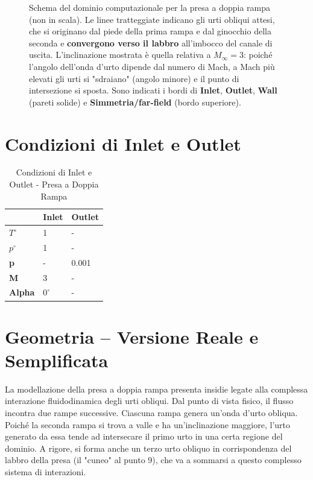 \begin{figure}[H]
  \caption{Schema del dominio computazionale per la presa a doppia rampa (non in scala).
           Le linee tratteggiate indicano gli urti obliqui attesi, che si originano dal piede
           della prima rampa e dal ginocchio della seconda e \textbf{convergono verso il labbro}
           all'imbocco del canale di uscita. L'inclinazione mostrata è quella relativa a
           $M_\infty = 3$: poiché l'angolo dell'onda d'urto dipende dal numero di Mach, a Mach
           più elevati gli urti si "sdraiano" (angolo minore) e il punto di intersezione si
           sposta. Sono indicati i bordi di \textbf{Inlet}, \textbf{Outlet}, \textbf{Wall}
           (pareti solide) e \textbf{Simmetria/far-field} (bordo superiore).}
  \label{fig:dominio_presa}
\end{figure}

\section{Condizioni di Inlet e Outlet}

\begin{table}[h!]
\centering
\begin{tabular}{|l|l|l|}
\hline
 & \textbf{Inlet} & \textbf{Outlet} \\ \hline
\textbf{$T^\circ$} & 1 & - \\ \hline
\textbf{$p^\circ$} & 1 & - \\ \hline
\textbf{p} & - & 0.001 \\ \hline
\textbf{M} & 3 & - \\ \hline
\textbf{Alpha} & $0^\circ$ & - \\ \hline
\end{tabular}
\caption{Condizioni di Inlet e Outlet - Presa a Doppia Rampa}
\label{tab:doppia_rampa_conditions}
\end{table}

\section{Geometria -- Versione Reale e Semplificata}
\label{sec:presa_geometrie}
La modellazione della presa a doppia rampa presenta insidie legate alla complessa interazione fluidodinamica degli urti obliqui. Dal punto di vista fisico, il flusso incontra due rampe successive. Ciascuna rampa genera un'onda d'urto obliqua. Poiché la seconda rampa si trova a valle e ha un'inclinazione maggiore, l'urto generato da essa tende ad intersecare il primo urto in una certa regione del dominio. A rigore, si forma anche un terzo urto obliquo in corrispondenza del labbro della presa (il "cuneo" al punto 9), che va a sommarsi a questo complesso sistema di interazioni.

